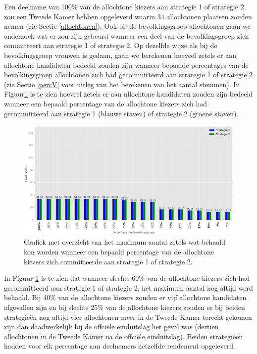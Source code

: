 \indent Een deelname van 100\% van de allochtone kiezers aan strategie 1 of strategie 2 zou een Tweede Kamer hebben opgeleverd waarin 34 allochtonen plaatsen zouden nemen (zie Sectie \ref{allochtonen}). Ook bij de bevolkingsgroep allochtonen gaan we onderzoek wat er zou zijn gebeurd wanneer een deel van de bevolkingsgroep zich committeert aan strategie 1 of strategie 2. Op dezelfde wijze als bij de bevolkingsgroep vrouwen is gedaan, gaan we berekenen hoeveel zetels er aan allochtone kandidaten bedeeld zouden zijn wanneer bepaalde percentages van de bevolkingsgroep allochtonen zich had gecommitteerd aan strategie 1 of strategie 2 (zie Sectie \ref{percV} voor uitleg van het berekenen van het aantal stemmen). In Figuur\ref{fig:PerA} is te zien hoeveel zetels er aan allochtone kandidaten zouden zijn bedeeld wanneer een bepaald percentage van de allochtone kiezers zich had gecommitteerd aan strategie 1 (blauwe staven) of strategie 2 (groene staven).  

\begin{figure}[H]


	\includegraphics[width=\linewidth]{percentages_van_allochtonenS1S2.png}

			\caption{Grafiek met overzicht van het maximum aantal zetels wat behaald kon worden wanneer een bepaald percentage van de allochtone kiezers zich committeerde aan strategie 1 of strategie 2.}

\label{fig:PerA}
\end{figure}

In Figuur \ref{fig:PerA} is te zien dat wanneer slechts 60\% van de allochtone kiezers zich had gecommitteerd aan strategie 1 of strategie 2, het maximum aantal nog altijd werd behaald. Bij 40\% van de allochtone kiezers zouden er vijf allochtone kandidaten afgevallen zijn en bij slechts 25\% van de allochtone kiezers zouden er bij beiden strategie\"{e}n nog altijd vier allochtonen meer in de Tweede Kamer terecht gekomen zijn dan daadwerkelijk bij de offci\"{e}le einduitslag het geval was (dertien allochtonen in de Tweede Kamer na de offci\"{e}le einduitslag). Beiden strategie\"{e}n hadden voor elk percentage aan deelnemers hetzelfde rendement opgeleverd.




